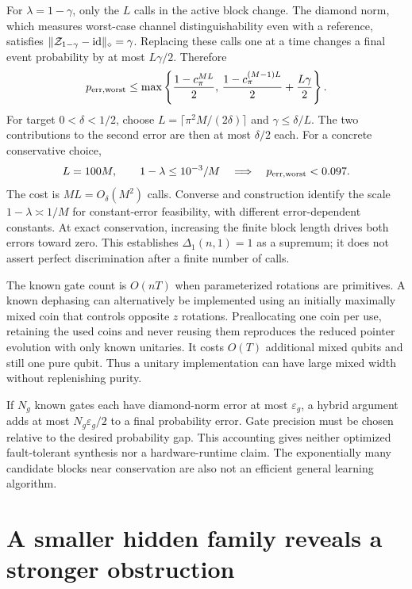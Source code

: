 \documentclass[11pt,a4paper]{article}
\numberwithin{equation}{section}
\theoremstyle{definition}
\theoremstyle{remark}
\begin{document}
For $\lambda=1-\gamma$, only the $L$ calls in the active block change.
The diamond norm, which measures worst-case channel distinguishability even
with a reference, satisfies
$\|\mathcal Z_{1-\gamma}-{\rm id}\|_\diamond=\gamma$.
Replacing these calls one at a time changes a final event probability by
at most $L\gamma/2$. Therefore
\begin{equation}
 p_{\rm err,worst}\leq
 \max\left\{\frac{1-c_\pi^{ML}}2,\,
       \frac{1-c_\pi^{(M-1)L}}2+\frac{L\gamma}{2}\right\}.
 \label{q:robust-scan}
\end{equation}
For target $0<\delta<1/2$, choose
$L=\lceil\pi^2M/(2\delta)\rceil$ and $\gamma\leq\delta/L$.
The two contributions to the second error are then at most $\delta/2$
each. For a concrete conservative choice,
\[
 L=100M,\qquad 1-\lambda\leq10^{-3}/M
 \quad\Longrightarrow\quad p_{\rm err,worst}<0.097.
\]
The cost is $ML=O_\delta(M^2)$ calls. Converse and construction identify the
scale $1-\lambda\asymp1/M$ for constant-error feasibility, with different
error-dependent constants. At exact conservation, increasing the finite
block length drives both errors toward zero. This establishes
$\Delta_1(n,1)=1$ as a supremum; it does not assert perfect discrimination
after a finite number of calls.

The known gate count is $O(nT)$ when parameterized rotations are primitives.
A known dephasing can alternatively be implemented using an initially
maximally mixed coin that controls opposite $z$ rotations. Preallocating one
coin per use, retaining the used coins and never reusing them reproduces the
reduced pointer evolution with only known unitaries. It costs $O(T)$ additional
mixed qubits and still one pure qubit. Thus a unitary implementation can have
large mixed width without replenishing purity.

If $N_g$ known gates each have diamond-norm error at most $\varepsilon_g$,
a hybrid argument adds at most $N_g\varepsilon_g/2$ to a final probability
error. Gate precision must be chosen relative to the desired probability gap.
This accounting gives neither optimized fault-tolerant synthesis nor a
hardware-runtime claim. The exponentially many candidate blocks near
conservation are also not an efficient general learning algorithm.

\section{A smaller hidden family reveals a stronger obstruction}
\end{document}
